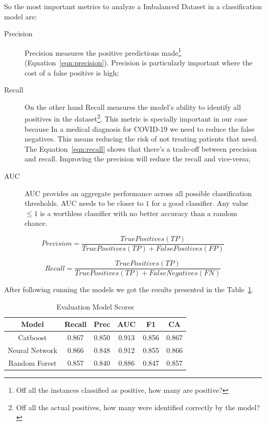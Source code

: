 So the most important metrics to analyze a Imbalanced Dataset
in a classification model are:
\begin{description}
    \item[Precision] Precision measures the positive predictions
    made\footnote{Off all the instances classified as positive, how
    many are positive?} (Equation~\ref{eqn:precision}). Precision
    is particularly important where the cost of a false positive is
    high;
    \item[Recall] On the other hand Recall measures the model's 
    ability to identify all positives in the dataset\footnote{
    Off all the actual positives, how many were identified 
    correctly by the model?}. This metric is specially important
    in our case because In a medical diagnosis for COVID-19 we 
    need
    to reduce the false negatives. This means reducing the risk of
    not treating patients that need. The Equation~\ref{eqn:recall}
    shows that
    there's a trade-off between precision and recall. Improving 
    the precision will reduce the recall and vice-versa;
    \item[AUC] AUC provides an aggregate performance across
    all possible classification thresholds. AUC needs to be closer
    to $1$ for a good classifier. Any value $\le 1$ is a worthless
    classifier with no better accuracy than a random chance.
\end{description}

\begin{equation}
\label{eqn:precision}
Precision = \frac{True Positives (TP)}{True Positives (TP) + False Positives (FP)}
\end{equation}

\begin{equation}
\label{eqn:recall}
Recall = \frac{True Positives (TP)}{True Positives (TP) + False Negatives (FN)}
\end{equation}

After following running the models we got the results presented
in the Table~\ref{tab:model_results}.

\begin{table}[H]
    \centering
    \caption{Evaluation Model Scores}
    \label{tab:model_results}
    \begin{tabular}{cccccc} \hline
     \textbf{Model} & \textbf{Recall} & \textbf{Prec} & \textbf{AUC} & \textbf{F1} & \textbf{CA} \\ \hline\hline
     Catboost       & 0.867 & 0.850 & 0.913 & 0.856 & 0.867 \\ 
     Neural Network & 0.866 & 0.848 & 0.912 & 0.855 & 0.866 \\ 
     Random Forest  & 0.857 & 0.840 & 0.886 & 0.847 & 0.857 \\ \hline
    \end{tabular}
\end{table}

